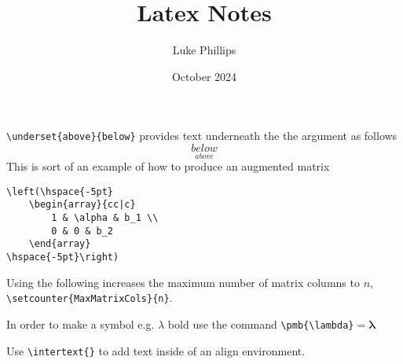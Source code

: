 \documentclass[10pt, a4paper]{article}
\title{Latex Notes}
\author{Luke Phillips}
\date{October 2024}
\begin{document}
\maketitle

\newpage

\verb|\underset{above}{below}| provides text underneath the the argument as follows
\[
\underset{above}{below}
\]
This is sort of an example of how to produce an augmented matrix
\begin{verbatim}
\left(\hspace{-5pt}
    \begin{array}{cc|c}
        1 & \alpha & b_1 \\
        0 & 0 & b_2
    \end{array}
\hspace{-5pt}\right)
\end{verbatim}

Using the following increases the maximum number of matrix columns to $n$,
\verb|\setcounter{MaxMatrixCols}{n}|.

In order to make a symbol e.g. $\lambda$ bold use the command \verb|\pmb{\lambda}|$ = \pmb{\lambda}$

Use \verb|\intertext{}| to add text inside of an align environment.
\end{document}
